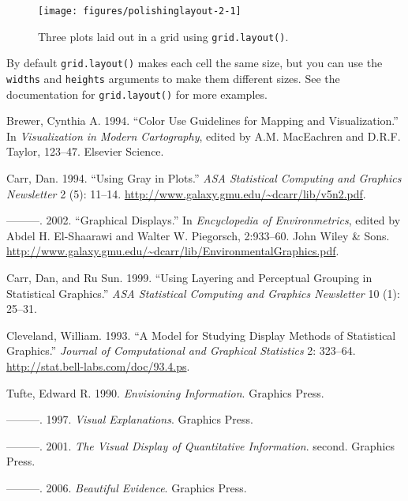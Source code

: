\begin{figure}

{\centering \texttt{[image: figures/polishinglayout-2-1]} 

}

\caption{Three plots laid out in a grid using \texttt{grid.layout()}.\label{fig:layout-2}}
\end{figure}

By default \texttt{grid.layout()} makes each cell the same size, but you
can use the \texttt{widths} and \texttt{heights} arguments to make them
different sizes. See the documentation for \texttt{grid.layout()} for
more examples.

Brewer, Cynthia A. 1994. ``Color Use Guidelines for Mapping and
Visualization.'' In \emph{Visualization in Modern Cartography}, edited
by A.M. MacEachren and D.R.F. Taylor, 123--47. Elsevier Science.

Carr, Dan. 1994. ``Using Gray in Plots.'' \emph{ASA Statistical
Computing and Graphics Newsletter} 2 (5): 11--14.
\url{http://www.galaxy.gmu.edu/~dcarr/lib/v5n2.pdf}.

---------. 2002. ``Graphical Displays.'' In \emph{Encyclopedia of
Environmetrics}, edited by Abdel H. El-Shaarawi and Walter W. Piegorsch,
2:933--60. John Wiley \& Sons.
\url{http://www.galaxy.gmu.edu/~dcarr/lib/EnvironmentalGraphics.pdf}.

Carr, Dan, and Ru Sun. 1999. ``Using Layering and Perceptual Grouping in
Statistical Graphics.'' \emph{ASA Statistical Computing and Graphics
Newsletter} 10 (1): 25--31.

Cleveland, William. 1993. ``A Model for Studying Display Methods of
Statistical Graphics.'' \emph{Journal of Computational and Graphical
Statistics} 2: 323--64. \url{http://stat.bell-labs.com/doc/93.4.ps}.

Tufte, Edward R. 1990. \emph{Envisioning Information}. Graphics Press.

---------. 1997. \emph{Visual Explanations}. Graphics Press.

---------. 2001. \emph{The Visual Display of Quantitative Information}.
second. Graphics Press.

---------. 2006. \emph{Beautiful Evidence}. Graphics Press.
